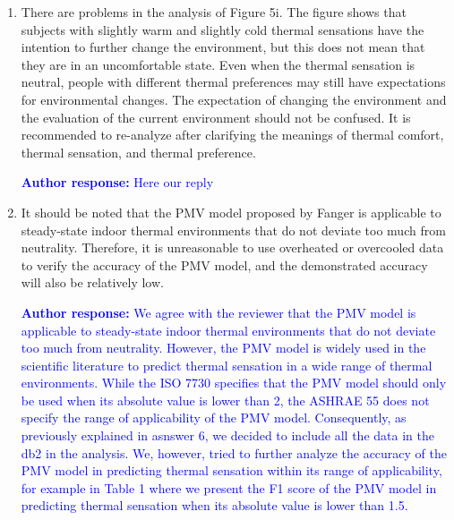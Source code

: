 \documentclass[a4paper, 10pt]{letter}
\newcommand{\response}[1]{\textcolor{blue}{\textbf{Author response:} #1}}
\begin{document}
\begin{letter}
\begin{enumerate}
            \response{
                Thank you for pointing this out.
                We made a mistake in the body manuscript and we should have written that the ``thermal sensation was measured with \sout{at least} a seven-point scale''.
                The peer-reviewed paper which describe the \ac{db2} states that the thermal sensation votes were collected using a seven-point scale and coded as follows ``-3 cold, -2 cool, -1 slightly cool, 0 neutral, +1 slightly warm, +2 warm, +3 hot''.
                We have corrected this mistake in the manuscript.
            }

            \item There are problems in the analysis of Figure 5i.
            The figure shows that subjects with slightly warm and slightly cold thermal sensations have the intention to further change the environment, but this does not mean that they are in an uncomfortable state.
            Even when the thermal sensation is neutral, people with different thermal preferences may still have expectations for environmental changes.
            The expectation of changing the environment and the evaluation of the current environment should not be confused.
            It is recommended to re-analyze after clarifying the meanings of thermal comfort, thermal sensation, and thermal preference.

            \response{Here our reply}

            \item It should be noted that the PMV model proposed by Fanger is applicable to steady-state indoor thermal environments that do not deviate too much from neutrality.
            Therefore, it is unreasonable to use overheated or overcooled data to verify the accuracy of the PMV model, and the demonstrated accuracy will also be relatively low.

            \response{
                We agree with the reviewer that the PMV model is applicable to steady-state indoor thermal environments that do not deviate too much from neutrality.
                However, the PMV model is widely used in the scientific literature to predict thermal sensation in a wide range of thermal environments.
                While the ISO 7730 specifies that the PMV model should only be used when its absolute value is lower than 2, the ASHRAE 55 does not specify the range of applicability of the PMV model.
                Consequently, as previously explained in asnswer 6, we decided to include all the data in the \ac{db2} in the analysis.
                We, however, tried to further analyze the accuracy of the PMV model in predicting thermal sensation within its range of applicability, for example in Table 1 where we present the F1 score of the PMV model in predicting thermal sensation when its absolute value is lower than 1.5.
            }


\end{enumerate}
\end{letter}
\end{document}
